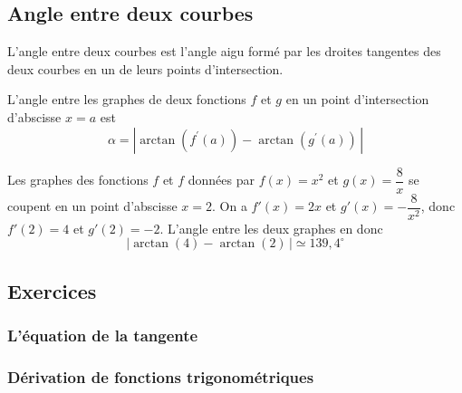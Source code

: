 \documentclass[a4paper,12pt]{article}
\begin{document}
\subsection{Angle entre deux courbes}
\begin{definition}
	\tcblower
	L'angle entre deux courbes est l'angle aigu formé par les droites tangentes des deux courbes en un de leurs points d'intersection.
\end{definition}
\begin{formule}
	\tcblower
	L'angle entre les graphes de deux fonctions $f$ et $g$ en un point d'intersection d'abscisse $x=a$ est 
	\[\alpha=|\arctan(f^\prime(a))-\arctan(g^\prime(a))\,|\]
\end{formule}
\begin{exemple}
	\tcblower
	Les graphes des fonctions $f$ et $f$ données par $f(x)=x^2$ et $g(x)=\dfrac{8}{x}$ se coupent en un point d'abscisse $x=2$. On a $f'(x)=2x$ et $g'(x)=-\dfrac{8}{x^2}$, donc $f'(2)=4$ et $g'(2)=-2$. L'angle entre les deux graphes en donc 
	\[|\arctan(4)-\arctan(2)\,|\simeq 139,4^\circ\]
\end{exemple}


\subsection{Exercices}








\subsubsection{L'équation de la tangente}

\subsubsection{Dérivation de fonctions trigonométriques}
\end{document}
